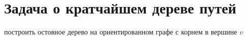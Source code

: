 \documentclass[discrete.tex]{subfiles}
\begin{document}
\section{Задача о кратчайшем дереве путей}

\begin{task}
    построить остовное дерево на ориентированном графе с корнем в вершине $v$
\end{task}

\begin{definition}
    \begin{enumerate}

    \end{enumerate}
\end{definition}
\end{document}
